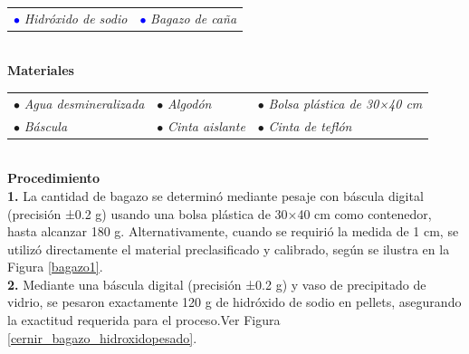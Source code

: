 \documentclass[12pt]{article}
\begin{document}
			\begin{tabular}{p{0.3\textwidth}p{}}
				\textcolor{blue}{$\bullet$} \textit{Hidróxido de sodio} &	\textcolor{blue}{$\bullet$}\textit{ Bagazo de caña} 
			\end{tabular} \\[ 1em]
			
			
			
			\textbf{Materiales} 
			\\[1 em]
			
			\begin{tabular}{p{}p{}p{}}
				$\bullet$ \textit{Agua desmineralizada }& $\bullet$ \textit{Algodón }& $\bullet$ \textit{Bolsa plástica de 30×40 cm} \\
				$\bullet$ \textit{Báscula} & $\bullet$ \textit{Cinta aislante} & $\bullet$ \textit{Cinta de teflón}
			\end{tabular}
			\\[0.5em]
			
			
			\textbf{Procedimiento}
			\\[0.5em]
			
			\textbf{1.}	La cantidad de bagazo se determinó mediante pesaje con báscula digital (precisión ±0.2 g) usando una bolsa plástica de 30×40 cm como contenedor, hasta alcanzar 180 g. Alternativamente, cuando se requirió la medida de 1 cm, se utilizó directamente el material preclasificado y calibrado, según se ilustra en la Figura \ref{bagazo1}.\\
			
			\textbf{2.} Mediante una báscula digital (precisión ±0.2 g) y vaso de precipitado de vidrio, se pesaron exactamente 120 g de hidróxido de sodio en pellets, asegurando la exactitud requerida para el proceso.Ver Figura \ref{cernir_bagazo_hidroxidopesado}.
			
\end{document}
